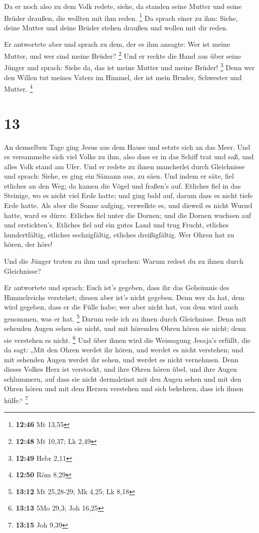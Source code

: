  Da er noch also zu dem Volk redete, siehe, da standen
seine Mutter und seine Brüder draußen, die wollten mit ihm reden.
\footnote{\textbf{12:46} Mt 13,55}  Da sprach einer zu ihm:
Siehe, deine Mutter und deine Brüder stehen draußen und wollen mit dir
reden.

 Er antwortete aber und sprach zu dem, der es ihm ansagte:
Wer ist meine Mutter, und wer sind meine Brüder? \footnote{\textbf{12:48}
  Mt 10,37; Lk 2,49}  Und er reckte die Hand aus über seine
Jünger und sprach: Siehe da, das ist meine Mutter und meine Brüder!
\footnote{\textbf{12:49} Hebr 2,11}  Denn wer den Willen
tut meines Vaters im Himmel, der ist mein Bruder, Schwester und Mutter.
\footnote{\textbf{12:50} Röm 8,29}

\hypertarget{section-9}{%
\section{13}\label{section-9}}

 An demselben Tage ging Jesus aus dem Hause und setzte sich
an das Meer.  Und es versammelte sich viel Volks zu ihm,
also dass er in das Schiff trat und saß, und alles Volk stand am Ufer.
 Und er redete zu ihnen mancherlei durch Gleichnisse und
sprach: Siehe, es ging ein Sämann aus, zu säen.  Und indem
er säte, fiel etliches an den Weg; da kamen die Vögel und fraßen's auf.
 Etliches fiel in das Steinige, wo es nicht viel Erde hatte;
und ging bald auf, darum dass es nicht tiefe Erde hatte. 
Als aber die Sonne aufging, verwelkte es, und dieweil es nicht Wurzel
hatte, ward es dürre.  Etliches fiel unter die Dornen; und
die Dornen wuchsen auf und erstickten's.  Etliches fiel auf
ein gutes Land und trug Frucht, etliches hundertfältig, etliches
sechzigfältig, etliches dreißigfältig.  Wer Ohren hat zu
hören, der höre!

 Und die Jünger traten zu ihm und sprachen: Warum redest du
zu ihnen durch Gleichnisse?

 Er antwortete und sprach: Euch ist's gegeben, dass ihr das
Geheimnis des Himmelreichs verstehet; diesen aber ist's nicht gegeben.
 Denn wer da hat, dem wird gegeben, dass er die Fülle habe;
wer aber nicht hat, von dem wird auch genommen, was er hat. \footnote{\textbf{13:12}
  Mt 25,28-29; Mk 4,25; Lk 8,18}  Darum rede ich zu ihnen
durch Gleichnisse. Denn mit sehenden Augen sehen sie nicht, und mit
hörenden Ohren hören sie nicht; denn sie verstehen es nicht. \footnote{\textbf{13:13}
  5Mo 29,3; Joh 16,25}  Und über ihnen wird die Weissagung
Jesaja's erfüllt, die da sagt: „Mit den Ohren werdet ihr hören, und
werdet es nicht verstehen; und mit sehenden Augen werdet ihr sehen, und
werdet es nicht vernehmen.  Denn dieses Volkes Herz ist
verstockt, und ihre Ohren hören übel, und ihre Augen schlummern, auf
dass sie nicht dermaleinst mit den Augen sehen und mit den Ohren hören
und mit dem Herzen verstehen und sich bekehren, dass ich ihnen hülfe.``
\footnote{\textbf{13:15} Joh 9,39}

